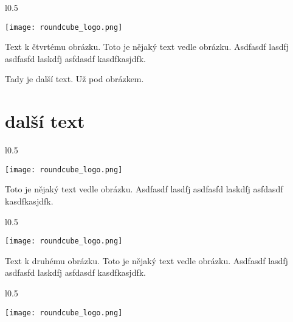 \documentclass[12pt,a4paper,twoside]{book}
\begin{document}
\begin{wrapfigure}{l}{0.5\textwidth}
  \vspace{-20pt}
  \begin{center}
    \texttt{[image: roundcube\_logo.png]}
  \end{center}
  \vspace{-20pt}
\end{wrapfigure}

Text k čtvrtému obrázku. Toto je nějaký text vedle obrázku. Asdfasdf lasdfj asdfasfd laskdfj asfdasdf kasdfkasjdfk.
\newline


Tady je další text. Už pod obrázkem.

\section{další  text}

\begin{wrapfigure}{l}{0.5\textwidth}
  \vspace{-30pt}
  \begin{center}
    \texttt{[image: roundcube\_logo.png]}
  \end{center}
  \vspace{-10pt}
\end{wrapfigure}

Toto je nějaký text vedle obrázku. Asdfasdf lasdfj asdfasfd laskdfj asfdasdf kasdfkasjdfk.
\newline

\begin{wrapfigure}{l}{0.5\textwidth}
  \vspace{-20pt}
  \begin{center}
    \texttt{[image: roundcube\_logo.png]}
  \end{center}
  \vspace{-20pt}
\end{wrapfigure}

Text k druhému obrázku. Toto je nějaký text vedle obrázku. Asdfasdf lasdfj asdfasfd laskdfj asfdasdf kasdfkasjdfk.
\newline

\begin{wrapfigure}{l}{0.5\textwidth}
  \vspace{-20pt}
  \begin{center}
    \texttt{[image: roundcube\_logo.png]}
  \end{center}
  \vspace{-20pt}
\end{wrapfigure}
\end{document}
